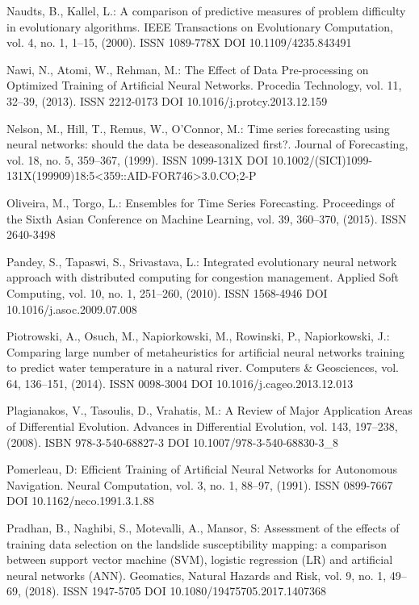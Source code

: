\begin{thebibliography}{99.}
 Naudts, B., Kallel, L.: A comparison of predictive measures of problem difficulty in evolutionary algorithms. IEEE Transactions on Evolutionary Computation, vol. 4, no. 1, 1--15, (2000). ISSN 1089-778X DOI 10.1109/4235.843491

 Nawi, N., Atomi, W., Rehman, M.: The Effect of Data Pre-processing on Optimized Training of Artificial Neural Networks. Procedia Technology, vol. 11, 32--39, (2013). ISSN 2212-0173 DOI 10.1016/j.protcy.2013.12.159

 Nelson, M., Hill, T., Remus, W., O'Connor, M.: Time series forecasting using neural networks: should the data be deseasonalized first?. Journal of Forecasting, vol. 18, no. 5, 359--367, (1999). ISSN 1099-131X DOI 10.1002/(SICI)1099-131X(199909)18:5<359::AID-FOR746>3.0.CO;2-P

 Oliveira, M., Torgo, L.: Ensembles for Time Series Forecasting. Proceedings of the Sixth Asian Conference on Machine Learning, vol. 39, 360--370, (2015). ISSN 2640-3498

 Pandey, S., Tapaswi, S., Srivastava, L.: Integrated evolutionary neural network approach with distributed computing for congestion management. Applied Soft Computing, vol. 10, no. 1, 251--260, (2010). ISSN 1568-4946 DOI 10.1016/j.asoc.2009.07.008

 Piotrowski, A., Osuch, M., Napiorkowski, M., Rowinski, P., Napiorkowski, J.: Comparing large number of metaheuristics for artificial neural networks training to predict water temperature in a natural river. Computers \& Geosciences, vol. 64, 136--151, (2014). ISSN 0098-3004 DOI 10.1016/j.cageo.2013.12.013

 Plagianakos, V., Tasoulis, D., Vrahatis, M.: A Review of Major Application Areas of Differential Evolution. Advances in Differential Evolution, vol. 143, 197--238, (2008). ISBN 978-3-540-68827-3 DOI 10.1007/978-3-540-68830-3\_8

 Pomerleau, D: Efficient Training of Artificial Neural Networks for Autonomous Navigation. Neural Computation, vol. 3, no. 1, 88--97, (1991). ISSN 0899-7667 DOI 10.1162/neco.1991.3.1.88

 Pradhan, B., Naghibi, S., Motevalli, A., Mansor, S: Assessment of the effects of training data selection on the landslide susceptibility mapping: a comparison between support vector machine (SVM), logistic regression (LR) and artificial neural networks (ANN). Geomatics, Natural Hazards and Risk, vol. 9, no. 1, 49--69, (2018). ISSN 1947-5705 DOI 10.1080/19475705.2017.1407368


\end{thebibliography}
